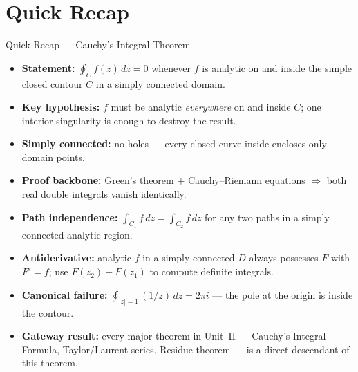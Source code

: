 \documentclass[12pt,a4paper]{article}
\begin{document}
\section{Quick Recap}

\begin{learnbox}{Quick Recap --- Cauchy's Integral Theorem}
\begin{itemize}
  \item \textbf{Statement:} $\oint_{C} f(z)\,dz = 0$ whenever $f$ is analytic on and inside
        the simple closed contour $C$ in a simply connected domain.
  \item \textbf{Key hypothesis:} $f$ must be analytic \emph{everywhere} on and inside $C$;
        one interior singularity is enough to destroy the result.
  \item \textbf{Simply connected:} no holes --- every closed curve inside encloses only
        domain points.
  \item \textbf{Proof backbone:} Green's theorem $+$ Cauchy--Riemann equations $\Rightarrow$
        both real double integrals vanish identically.
  \item \textbf{Path independence:} $\int_{C_1}f\,dz = \int_{C_2}f\,dz$ for any two paths
        in a simply connected analytic region.
  \item \textbf{Antiderivative:} analytic $f$ in a simply connected $D$ always possesses
        $F$ with $F'=f$; use $F(z_2)-F(z_1)$ to compute definite integrals.
  \item \textbf{Canonical failure:} $\oint_{|z|=1}(1/z)\,dz = 2\pi i$ --- the pole at the
        origin is inside the contour.
  \item \textbf{Gateway result:} every major theorem in Unit~II --- Cauchy's Integral Formula,
        Taylor/Laurent series, Residue theorem --- is a direct descendant of this theorem.
\end{itemize}
\end{learnbox}
\end{document}
